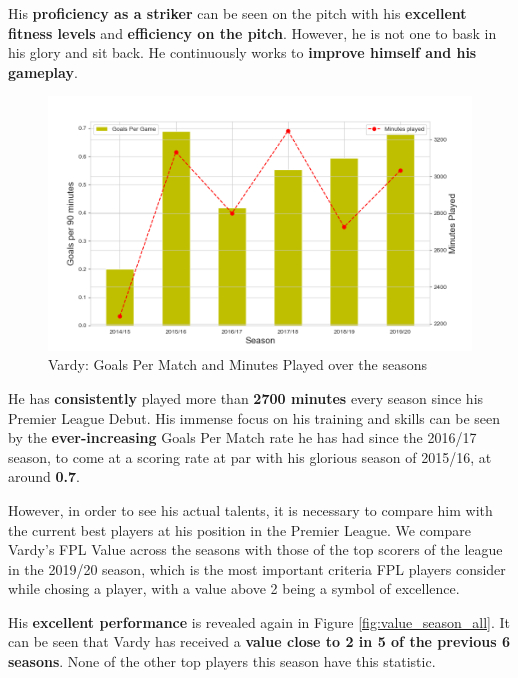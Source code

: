 \documentclass{article}
\begin{document}
His \textbf{proficiency as a striker} can be seen on the pitch with his \textbf{excellent fitness levels} and \textbf{efficiency on the pitch}. However, he is not one to bask in his glory and sit back. He continuously works to \textbf{improve himself and his gameplay}.
\begin{figure}[H]
    \centering
    \includegraphics[width=1\linewidth]{assets/gpm_season.png}
    \caption{Vardy: Goals Per Match and Minutes Played over the seasons}
    \label{fig:gpm_season}
\end{figure}
He has \textbf{consistently} played more than \textbf{2700 minutes} every season since his Premier League Debut. His immense focus on his training and skills can be seen by the \textbf{ever-increasing} Goals Per Match rate he has had since the 2016/17 season, to come at a scoring rate at par with his glorious season of 2015/16, at around \textbf{0.7}.

However, in order to see his actual talents, it is necessary to compare him with the current best players at his position in the Premier League. We compare Vardy's FPL Value across the seasons with those of the top scorers of the league in the 2019/20 season, which is the most important criteria FPL players consider while chosing a player, with a value above 2 being a symbol of excellence.

His \textbf{excellent performance} is revealed again in Figure \ref{fig:value_season_all}. It can be seen that Vardy has received a \textbf{value close to 2 in 5 of the previous 6 seasons}. None of the other top players this season have this statistic.
\end{document}

